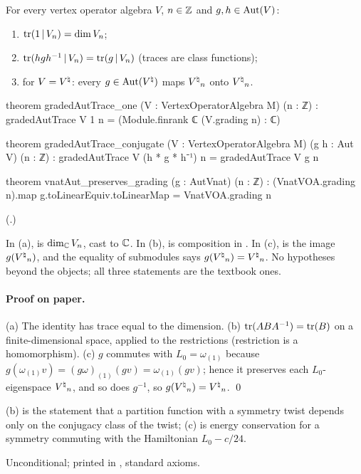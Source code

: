 \begin{proposition}\label{ch16:prop:traces}
For every vertex operator algebra $V$, $n\in{\mathbb{Z}}$ and $g,h\in\operatorname{Aut}(V)$:
\begin{enumerate}[label=(\alph*)]
\item $\operatorname{tr}(1\,|\,V_n)=\dim V_n$;
\item $\operatorname{tr}(hgh^{-1}\,|\,V_n)=\operatorname{tr}(g\,|\,V_n)$ (traces are class functions);
\item for $V={V^{\natural}}$: every $g\in\operatorname{Aut}({V^{\natural}})$ maps ${V^{\natural}}_n$ onto ${V^{\natural}}_n$.
\end{enumerate}
\end{proposition}
\begin{leancode}
theorem gradedAutTrace_one (V : VertexOperatorAlgebra M) (n : ℤ) :
    gradedAutTrace V 1 n = (Module.finrank ℂ (V.grading n) : ℂ)

theorem gradedAutTrace_conjugate (V : VertexOperatorAlgebra M) (g h : Aut V) (n : ℤ) :
    gradedAutTrace V (h * g * h⁻¹) n = gradedAutTrace V g n

theorem vnatAut_preserves_grading (g : AutVnat) (n : ℤ) :
    (VnatVOA.grading n).map g.toLinearEquiv.toLinearMap = VnatVOA.grading n
\end{leancode}
(.)
\begin{dictionary}
In (a),  is $\dim_{\mathbb{C}} V_n$, cast to ${\mathbb{C}}$.  In (b),  is
composition in .  In (c),  is the image
$g({V^{\natural}}_n)$, and the equality of submodules says $g({V^{\natural}}_n)={V^{\natural}}_n$.  No hypotheses beyond the objects; all three
statements are the textbook ones.
\end{dictionary}
\paragraph{Proof on paper.}  (a) The identity has trace equal to the dimension.  (b) $\operatorname{tr}(ABA^{-1})=\operatorname{tr}(B)$ on a
finite-dimensional space, applied to the restrictions (restriction is a homomorphism).  (c) $g$ commutes with
$L_0=\omega_{(1)}$ because $g(\omega_{(1)}v)=(g\omega)_{(1)}(gv)=\omega_{(1)}(gv)$; hence it preserves each
$L_0$-eigenspace ${V^{\natural}}_n$, and so does $g^{-1}$, so $g({V^{\natural}}_n)={V^{\natural}}_n$. \qed
\begin{physics}
(b) is the statement that a partition function with a symmetry twist depends only on the conjugacy class of the
twist; (c) is energy conservation for a symmetry commuting with the Hamiltonian $L_0-c/24$.
\end{physics}
\begin{status}
Unconditional; printed in , standard axioms.
\end{status}

